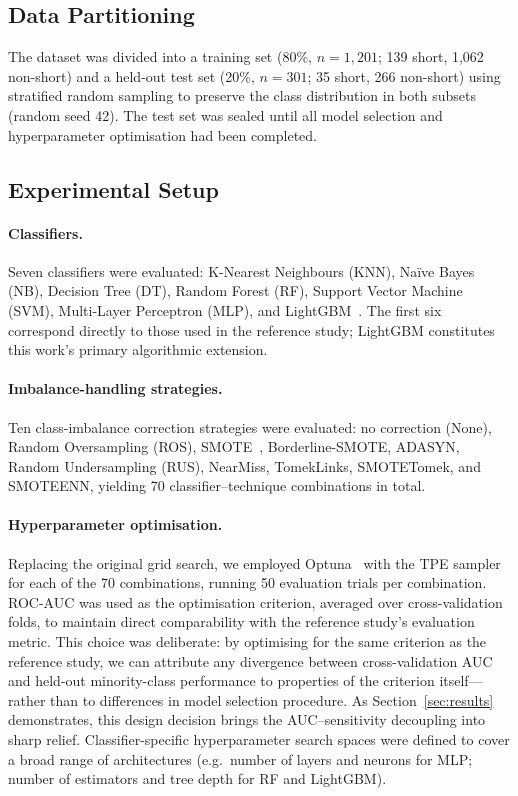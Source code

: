 \documentclass[a4paper,twoside]{article}
\begin{document}
\subsection{Data Partitioning}

The dataset was divided into a training set (80\%, $n = 1{,}201$; 139 short,
1,062 non-short) and a held-out test set (20\%, $n = 301$; 35 short, 266
non-short) using stratified random sampling to preserve the class distribution in
both subsets (random seed 42). The test set was sealed until all model selection
and hyperparameter optimisation had been completed.

\subsection{Experimental Setup}
\label{subsec:setup}

\paragraph{Classifiers.}
Seven classifiers were evaluated: K-Nearest Neighbours (KNN), Naïve Bayes (NB),
Decision Tree (DT), Random Forest (RF), Support Vector Machine (SVM),
Multi-Layer Perceptron (MLP), and LightGBM~\cite{ke2017lightgbm}. The first six
correspond directly to those used in the reference study; LightGBM constitutes this
work's primary algorithmic extension.

\paragraph{Imbalance-handling strategies.}
Ten class-imbalance correction strategies were evaluated: no correction (None),
Random Oversampling (ROS), SMOTE~\cite{chawla2002smote}, Borderline-SMOTE,
ADASYN, Random Undersampling (RUS), NearMiss, TomekLinks, SMOTETomek, and
SMOTEENN, yielding 70 classifier--technique combinations in total.

\paragraph{Hyperparameter optimisation.}
Replacing the original grid search, we employed Optuna~\cite{optuna2019} with
the TPE sampler for each of the 70 combinations, running 50 evaluation trials per
combination. ROC-AUC was used as the optimisation criterion, averaged over
cross-validation folds, to maintain direct comparability with the reference
study's evaluation metric. This choice was deliberate: by optimising for the same
criterion as the reference study, we can attribute any divergence between
cross-validation AUC and held-out minority-class performance to properties of the
criterion itself---rather than to differences in model selection procedure.
As Section~\ref{sec:results} demonstrates, this design decision brings the
AUC--sensitivity decoupling into sharp relief. Classifier-specific hyperparameter
search spaces were defined to cover a broad range of architectures (e.g.\ number
of layers and neurons for MLP; number of estimators and tree depth for RF and
LightGBM).
\end{document}
